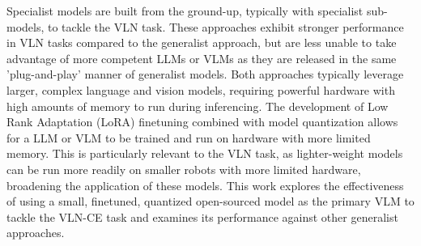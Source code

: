 \documentclass{svproc}
\begin{document}
    \par
    Specialist models \cite{hong2021_vlnbert, navgpt2, chen2021_HAMT, HE2024110511_MemoryAdaptiveVLN} are built from the ground-up, typically with specialist sub-models, to tackle the VLN task. These approaches exhibit stronger performance in VLN tasks compared to the generalist approach, but are less unable to take advantage of more competent LLMs or VLMs as they are released in the same 'plug-and-play' manner of generalist models.
    \newline
    Both approaches typically leverage larger, complex language and vision models, requiring powerful hardware with high amounts of memory to run during inferencing. The development of Low Rank Adaptation (LoRA) finetuning \cite{LoRA} combined with model quantization allows for a LLM or VLM to be trained and run on hardware with more limited memory. This is particularly relevant to the VLN task, as lighter-weight models can be run more readily on smaller robots with more limited hardware, broadening the application of these models.
    \newline
    This work explores the effectiveness of using a small, finetuned, quantized open-sourced model as the primary VLM to tackle the VLN-CE task and examines its performance against other generalist approaches. 
    
\end{document}
